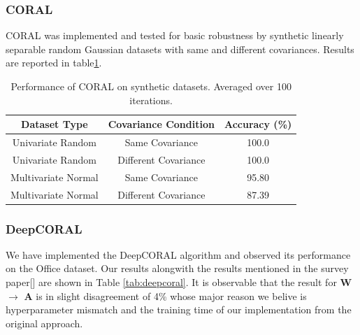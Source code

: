 \documentclass{article}
\begin{document}
\subsubsection{CORAL}
CORAL was implemented and tested for basic robustness by synthetic linearly separable random Gaussian datasets with same and different covariances. Results are reported in table\ref{tab:coral}.
\begin{table}
  \centering
  \caption{Performance of CORAL on synthetic datasets. Averaged over 100 iterations.}
  \label{tab:coral}
  \begin{tabular}{ccc}
    \toprule
    \textbf{Dataset Type} & \textbf{Covariance Condition} & \textbf{Accuracy (\%)} \\
    \midrule
    Univariate Random & Same Covariance & 100.0 \\
    Univariate Random & Different Covariance & 100.0 \\
    Multivariate Normal & Same Covariance & 95.80 \\
    Multivariate Normal & Different Covariance & 87.39 \\
    \bottomrule
  \end{tabular}
\end{table}

\subsubsection{DeepCORAL}
We have implemented the DeepCORAL algorithm and observed its performance on the Office dataset. Our results alongwith the results mentioned in the survey paper[\cite{DeepCoral}] are shown in Table \ref{tab:deepcoral}. It is observable that the result for \textbf{W}$\rightarrow$ \textbf{A} is in slight disagreement of 4\% whose major reason we belive is hyperparameter mismatch and the training time of our implementation from the original approach.
 
\end{document}
